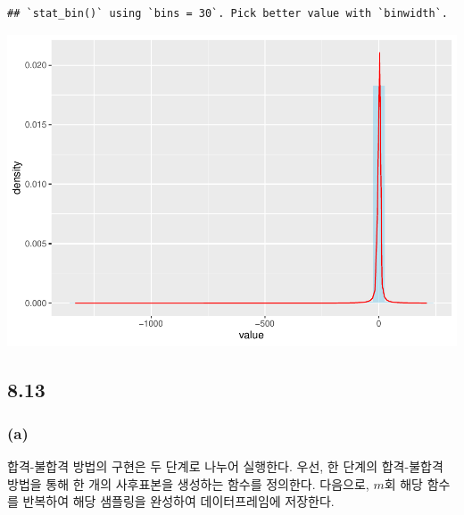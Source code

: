 \documentclass[
]{article}
\begin{document}
\begin{verbatim}
## `stat_bin()` using `bins = 30`. Pick better value with `binwidth`.
\end{verbatim}

\includegraphics{Bayes_stat_hw2_files/figure-latex/unnamed-chunk-12-1.pdf}

\subsection{8.13}\label{section-6}

\subsubsection{(a)}\label{a-2}

합격-불합격 방법의 구현은 두 단계로 나누어 실행한다. 우선, 한 단계의
합격-불합격 방법을 통해 한 개의 사후표본을 생성하는 함수를 정의한다.
다음으로, \(m\)회 해당 함수를 반복하여 해당 샘플링을 완성하여
데이터프레임에 저장한다.
\end{document}
